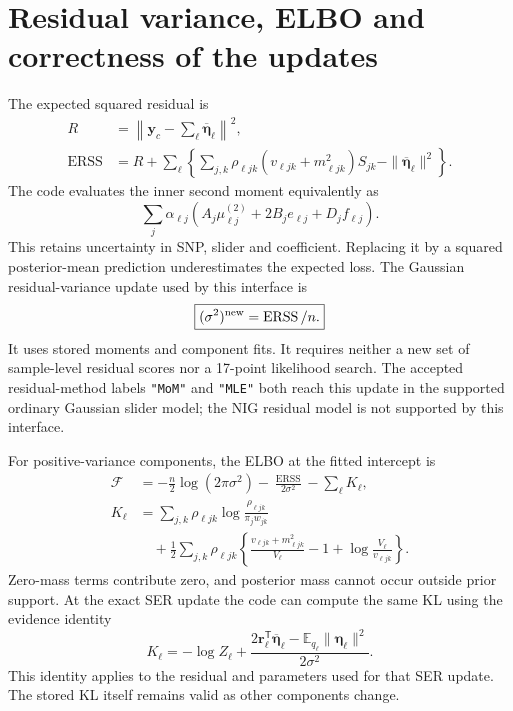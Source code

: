 \documentclass[11pt]{article}
\newcommand{\E}{\mathbb E}
\newcommand{\ERSS}{\operatorname{ERSS}}
\newcommand{\T}{^{\mathsf T}}
\newcommand{\yb}{\mathbf y_c}
\newcommand{\etal}{\overline{\boldsymbol\eta}}
\begin{document}
\section{Residual variance, ELBO and correctness of the updates}
\label{sec:objective}
The expected squared residual is
\begin{align}
 R&=\left\|\yb-\sum_\ell\etal_\ell\right\|^2,\nonumber\\
 \ERSS&=R+\sum_\ell\left\{
  \sum_{j,k}\rho_{\ell jk}(v_{\ell jk}+m_{\ell jk}^2)S_{jk}
                        -\|\etal_\ell\|^2\right\}.
 \label{eq:erss}
\end{align}
The code evaluates the inner second moment equivalently as
\begin{equation}
 \sum_j\alpha_{\ell j}
  \left(A_j\mu^{(2)}_{\ell j}+2B_je_{\ell j}+D_jf_{\ell j}\right).
 \label{eq:erss-aggregate}
\end{equation}
This retains uncertainty in SNP, slider and coefficient. Replacing it
by a squared posterior-mean prediction underestimates the expected loss.
The Gaussian residual-variance update used by this interface is
\begin{equation}
 \boxed{(\sigma^2)^{\rm new}=\ERSS/n.}
 \label{eq:sigma}
\end{equation}
It uses stored moments and component fits. It requires neither a new
set of sample-level residual scores nor a 17-point likelihood search.
The accepted residual-method labels \texttt{"MoM"} and \texttt{"MLE"}
both reach this update in the supported ordinary Gaussian slider model;
the NIG residual model is not supported by this interface.

For positive-variance components, the ELBO at the fitted intercept is
\begin{align}
 \mathcal F&=-\frac n2\log(2\pi\sigma^2)-\frac{\ERSS}{2\sigma^2}
             -\sum_\ell K_\ell,\label{eq:elbo}\\
 K_\ell&=\sum_{j,k}\rho_{\ell jk}
                 \log\frac{\rho_{\ell jk}}{\pi_jw_{jk}}\nonumber\\
 &\quad+\frac12\sum_{j,k}\rho_{\ell jk}
 \left\{\frac{v_{\ell jk}+m_{\ell jk}^2}{V_\ell}-1+
                    \log\frac{V_\ell}{v_{\ell jk}}\right\}.
 \label{eq:kl}
\end{align}
Zero-mass terms contribute zero, and posterior mass cannot occur outside
prior support. At the exact SER update the code can compute the same KL
using the evidence identity
\begin{equation}
 K_\ell=-\log Z_\ell+
 \frac{2\mathbf r_\ell\T\etal_\ell-
      \E_{q_\ell}\|\boldsymbol\eta_\ell\|^2}{2\sigma^2}.
 \label{eq:kl-short}
\end{equation}
This identity applies to the residual and parameters used for that SER
update. The stored KL itself remains valid as other components change.
\end{document}
